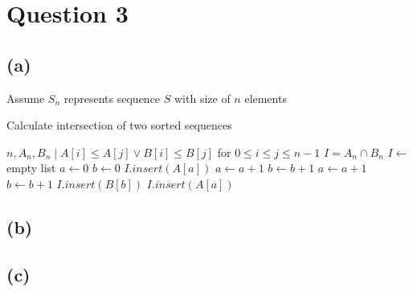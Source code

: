 \section{Question 3}
    \subsection{(a)} Assume $S_n$ represents sequence $S$ with size of $n$ elements
    
        \begin{algorithm}
        \caption{Calculate intersection of two sorted sequences}
        \begin{algorithmic} 
        \REQUIRE $n, A_n, B_n \mid A[i] \leq A[j] \vee B[i] \leq B[j]$ for $0 \leq i \leq j \leq n-1$
        \ENSURE $I=A_n \cap B_n$
        \STATE $I \leftarrow$ empty list
        \STATE $a \leftarrow 0$
        \STATE $b \leftarrow 0$
        \STATE $I.insert(A[a])$
        \STATE $a \leftarrow a+1$
        \STATE $b \leftarrow b+1$
        \STATE $a \leftarrow a+1$
        \STATE $b \leftarrow b+1$
        \ENDIF
        \ENDWHILE
        \STATE $I.insert(B[b])$
        \ENDIF
        \ENDFOR
        \STATE $I.insert(A[a])$
        \ENDIF
        \ENDFOR
        \ENDIF
        \end{algorithmic}
        \end{algorithm}
    
    \subsection{(b)}
    \subsection{(c)}